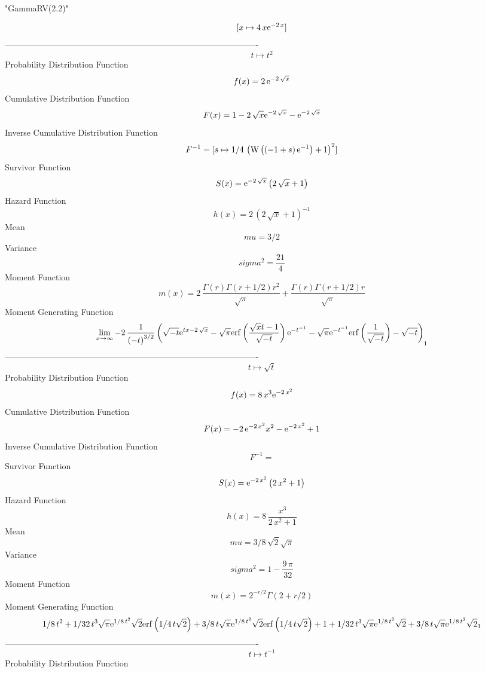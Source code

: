 \documentclass[12pt]{article}
\begin{document}
 
                               "GammaRV(2.2)"

$$[x\mapsto 4\,x{{\rm e}^{-2\,x}}]
$$-------------------------------------------------------------------------------------------  \\$$t\mapsto {t}^{2}
$$Probability Distribution Function 
$$  f(x)=2\,{{\rm e}^{-2\,\sqrt {x}}}
$$Cumulative Distribution Function  
 $$F(x)=1-2\,\sqrt {x}{{\rm e}^{-2\,\sqrt {x}}}-{{\rm e}^{-2\,\sqrt {x}}}
$$ Inverse Cumulative Distribution Function 
  $$F^{-1} = [s\mapsto 1/4\, \left( {\rm W} \left( \left( -1+s \right) {{\rm e}^{-1
}}\right)+1 \right) ^{2}]
$$Survivor Function 
 $$ S(x)={{\rm e}^{-2\,\sqrt {x}}} \left( 2\,\sqrt {x}+1 \right) 
$$ Hazard Function 
 $$ h(x)=2\, \left( 2\,\sqrt {x}+1 \right) ^{-1}
$$Mean 
 $$ mu=3/2
$$ Variance 
 $$ sigma^2 = {\frac{21}{4}}
$$Moment Function 
 $$ m(x) = 2\,{\frac {\Gamma \left( r \right) \Gamma \left( r+1/2 \right) {r}^{2}
}{\sqrt {\pi}}}+{\frac {\Gamma \left( r \right) \Gamma \left( r+1/2
 \right) r}{\sqrt {\pi}}}
$$ Moment Generating Function 
 $$\lim _{x\rightarrow \infty }-2\,{\frac {1}{ \left( -t \right) ^{3/2}}
 \left( \sqrt {-t}{{\rm e}^{tx-2\,\sqrt {x}}}-\sqrt {\pi}{\rm erf} 
\left({\frac {\sqrt {x}t-1}{\sqrt {-t}}}\right){{\rm e}^{-{t}^{-1}}}-
\sqrt {\pi}{{\rm e}^{-{t}^{-1}}}{\rm erf} \left({\frac {1}{\sqrt {-t}}
}\right)-\sqrt {-t} \right) }_{{1}}
$$-------------------------------------------------------------------------------------------  \\$$t\mapsto \sqrt {t}
$$Probability Distribution Function 
$$  f(x)=8\,{x}^{3}{{\rm e}^{-2\,{x}^{2}}}
$$Cumulative Distribution Function  
 $$F(x)=-2\,{{\rm e}^{-2\,{x}^{2}}}{x}^{2}-{{\rm e}^{-2\,{x}^{2}}}+1
$$ Inverse Cumulative Distribution Function 
  $$F^{-1} =
$$Survivor Function 
 $$ S(x)={{\rm e}^{-2\,{x}^{2}}} \left( 2\,{x}^{2}+1 \right) 
$$ Hazard Function 
 $$ h(x)=8\,{\frac {{x}^{3}}{2\,{x}^{2}+1}}
$$Mean 
 $$ mu=3/8\,\sqrt {2}\sqrt {\pi}
$$ Variance 
 $$ sigma^2 = 1-{\frac {9\,\pi}{32}}
$$Moment Function 
 $$ m(x) = {2}^{-r/2}\Gamma \left( 2+r/2 \right) 
$$ Moment Generating Function 
 $$1/8\,{t}^{2}+1/32\,{t}^{3}\sqrt {\pi}{{\rm e}^{1/8\,{t}^{2}}}\sqrt {2}
{\rm erf} \left(1/4\,t\sqrt {2}\right)+3/8\,t\sqrt {\pi}{{\rm e}^{1/8
\,{t}^{2}}}\sqrt {2}{\rm erf} \left(1/4\,t\sqrt {2}\right)+1+1/32\,{t}
^{3}\sqrt {\pi}{{\rm e}^{1/8\,{t}^{2}}}\sqrt {2}+3/8\,t\sqrt {\pi}{
{\rm e}^{1/8\,{t}^{2}}}\sqrt {2}_{{1}}
$$-------------------------------------------------------------------------------------------  \\$$t\mapsto {t}^{-1}
$$Probability Distribution Function 
\end{document}
